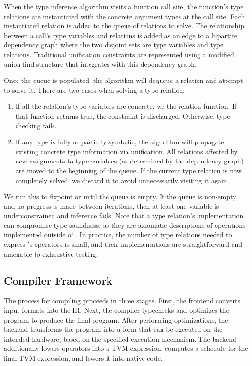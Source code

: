       When the type inference algorithm visits a function call site, the function's type relations are
        instantiated with the concrete argument types at the call site.
      Each instantiated relation is added to the queue of relations to solve.
      The relationship between a call's type variables and relations is added as an edge to
        a bipartite dependency graph where the two disjoint sets are type variables and type relations.
      Traditional unification constraints are represented using a modified union-find structure that
        integrates with this dependency graph.

      Once the queue is populated, the algorithm will dequeue a relation and attempt to solve it.
      There are two cases when solving a type relation:
      \begin{enumerate}
        \item If all the relation's type variables
        are concrete, we the relation function. If that function returns true, the
        constraint is discharged. Otherwise, type checking fails.
        \item If any type is fully or partially symbolic, the
          algorithm will propagate
          existing concrete type information via unification.
        All relations affected by new assignments to type
          variables (as determined by the dependency graph)
          are moved to the beginning of the queue.
        If the current type relation is now completely solved, we
        discard it to avoid unnecessarily visiting it again.
      \end{enumerate}

      We run this to fixpoint or until the queue is empty.
      If the queue is non-empty and no progress is made between iterations,
        then at least one variable is underconstrained and inference fails.
      Note that a type relation's implementation can
        compromise type soundness, as they are axiomatic descriptions
        of operations implemented outside of \relay.
      In practice, the number of type relations needed to express \relay's
        operators is small, and their implementations are straightforward
        and amenable to exhaustive testing.

      \subsection{Compiler Framework}

      The process for compiling \relay proceeds in three stages.
      First, the frontend converts input formats into the \relay IR.
      Next, the \relay compiler typechecks and optimizes the program
        to produce the final program.
      After performing optimizations,
        the \relay backend transforms
        the \relay program into a form that can be executed on
        the intended hardware, based on the specified execution mechanism.
      The backend additionally lowers \relay operators into a TVM expression,
        computes a schedule for the final TVM expression, and lowers it into
        native code.

